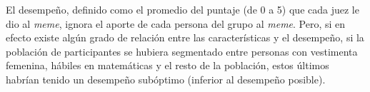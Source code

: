 El desempeño, definido como el promedio del puntaje (de 0 a 5) que cada juez le dio al \textit{meme}, ignora el aporte de cada persona del grupo al \textit{meme}. Pero, si en efecto existe algún grado de relación entre las características y el desempeño, si la población de participantes se hubiera segmentado entre personas con vestimenta femenina, hábiles en matemáticas y el resto de la población, estos últimos habrían tenido un desempeño subóptimo (inferior al desempeño posible). 
